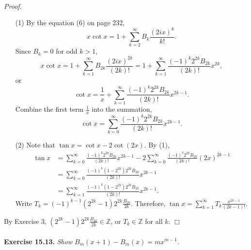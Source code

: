 \documentclass{article}
\begin{document}
\emph{Proof.}
\begin{enumerate}
\item[(1)]
By the equation (6) on page 232,
$$x \cot x = 1 + \sum_{k=2}^{\infty} B_k \frac{(2ix)^k}{k!}.$$
Since $B_k = 0$ for odd $k > 1$,
$$x \cot x
= 1 + \sum_{k=1}^{\infty} B_{2k} \frac{(2ix)^{2k}}{(2k)!}
= 1 + \sum_{k=1}^{\infty} \frac{(-1)^k 2^{2k}B_{2k}}{(2k)!} x^{2k},$$
or
$$\cot x
= \frac{1}{x} + \sum_{k=1}^{\infty} \frac{(-1)^k 2^{2k}B_{2k}}{(2k)!} x^{2k-1}.$$
Combine the first term $\frac{1}{x}$ into the summation,
$$\cot x = \sum_{k=0}^{\infty} \frac{(-1)^k 2^{2k}B_{2k}}{(2k)!} x^{2k-1}.$$
\item[(2)]
Note that $\tan x = \cot x - 2 \cot(2x)$.
By (1),
\begin{align*}
\tan x
&= \sum_{k=0}^{\infty} \frac{(-1)^k 2^{2k}B_{2k}}{(2k)!} x^{2k-1}
- 2 \sum_{k=0}^{\infty} \frac{(-1)^k 2^{2k}B_{2k}}{(2k)!} (2x)^{2k-1} \\
&= \sum_{k=0}^{\infty} \frac{(-1)^k (1 - 2^{2k}) 2^{2k} B_{2k}}{(2k)!} x^{2k-1} \\
&= \sum_{k=1}^{\infty} \frac{(-1)^k (1 - 2^{2k}) 2^{2k} B_{2k}}{(2k)!} x^{2k-1}.
\end{align*}
Write $T_k = (-1)^{k-1} (2^{2k} - 1) 2^{2k} \frac{B_{2k}}{2k}$.
Therefore, $\tan x = \sum_{k=1}^{\infty} T_k \frac{x^{2k - 1}}{(2k - 1)!}$.
\end{enumerate}
By Exercise 3, $(2^{2k} - 1) 2^{2k} \frac{B_{2k}}{2k} \in \mathbb{Z}$,
or $T_k \in \mathbb{Z}$ for all $k$.
$\Box$ \\\\



\textbf{Exercise 15.13.}
\emph{Show $B_m(x+1) - B_m(x) = mx^{m-1}$.} \\
\end{document}
